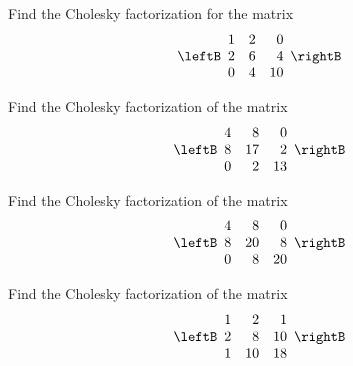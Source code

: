 \begin{enumialphparenastyle}

\begin{ex} Find the Cholesky factorization for the matrix 
\begin{equation*}
\allowbreak \leftB 
\begin{array}{rrr}
1 & 2 & 0 \\ 
2 & 6 & 4 \\ 
0 & 4 & 10
\end{array}
\rightB
\end{equation*}
\end{ex}

\begin{ex} Find the Cholesky factorization of the matrix 
\begin{equation*}
\leftB 
\begin{array}{rrr}
4 & 8 & 0 \\ 
8 & 17 & 2 \\ 
0 & 2 & 13
\end{array}
\rightB
\end{equation*}
\end{ex}

\begin{ex} Find the Cholesky factorization of the matrix 
\begin{equation*}
\leftB 
\begin{array}{rrr}
4 & 8 & 0 \\ 
8 & 20 & 8 \\ 
0 & 8 & 20
\end{array}
\rightB
\end{equation*}
\end{ex}

\begin{ex} Find the Cholesky factorization of the matrix 
\begin{equation*}
\leftB 
\begin{array}{rrr}
1 & 2 & 1 \\ 
2 & 8 & 10 \\ 
1 & 10 & 18
\end{array}
\rightB
\end{equation*}
\end{ex}


\end{enumialphparenastyle}
